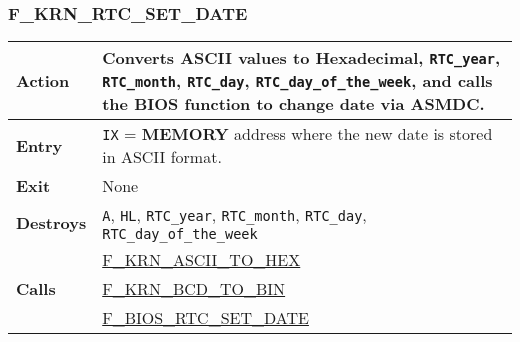     \subsubsection{F\_KRN\_RTC\_SET\_DATE}
    \label{func:fkrnrtcsetdate}
    \begin{tabular}{l p{15cm}}
        \hline\textbf{Action}
        & Converts ASCII values to Hexadecimal, \texttt{RTC\_year},
        \texttt{RTC\_month}, \texttt{RTC\_day}, \texttt{RTC\_day\_of\_the\_week},
        and calls the BIOS function to change date via \textbf{ASMDC}.\\
        \hline\textbf{Entry} & \texttt{IX} = \textbf{MEMORY} address where
        the new date is stored in ASCII format.\\
        \hline\textbf{Exit} & None \\
        \hline\textbf{Destroys} & \texttt{A}, \texttt{HL}, \texttt{RTC\_year},
        \texttt{RTC\_month}, \texttt{RTC\_day}, \texttt{RTC\_day\_of\_the\_week}\\
        \hline\multirow[t]{3}{4em}{\textbf{Calls}}
        & \hyperref[func:fkrnasciitohex]{F\_KRN\_ASCII\_TO\_HEX}\\
        & \hyperref[func:fkrnbcdtobin]{F\_KRN\_BCD\_TO\_BIN}\\
        & \hyperref[func:fbiosrtcsetdate]{F\_BIOS\_RTC\_SET\_DATE}\\
        \hline
    \end{tabular}